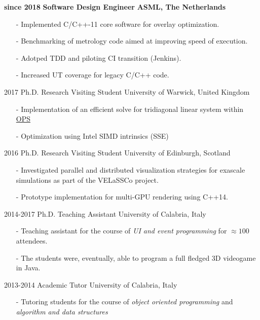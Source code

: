 \documentclass[]{twentysecondscv}
\begin{document}
\begin{twenty}
  \twentyitem
    {{\textbf{\color{darkgray}since 2018}}}
    {{\textbf{\color{darkgray}Software Design Engineer}}}
    {\textbf{\color{darkgray}ASML, The Netherlands}}
	{
		\vspace{-10pt}
		\begin{itemize}[leftmargin=*]
			\footnotesize
			\item[-] Implemented C/C++-11 core software for overlay optimization.
			\item[-] Benchmarking of metrology code aimed at improving speed of execution.
			\item[-] Adotped TDD and piloting CI transition (Jenkins).
			\item[-] Increased UT coverage for legacy C/C++ code.
		\end{itemize} 
	}
  \twentyitem
    {2017}
    {Ph.D.  Research Visiting Student}
    {University of Warwick, United Kingdom}
	{
		\vspace{-10pt}
		\begin{itemize}[leftmargin=*]
			\footnotesize
			\item[-] Implementation of an efficient solve for tridiagonal linear system within \href{https://github.com/OP-DSL/OPS}{OPS \faGithub}
			\item[-] Optimization using Intel SIMD intrinsics (SSE)
		\end{itemize} 
	}
  \twentyitem
    {2016}
    {Ph.D. {\normalfont Research Visiting Student}}
    {University of Edinburgh, Scotland}
	{
		\vspace{-10pt}
		\begin{itemize}[leftmargin=*]
			\footnotesize
			\item[-] Investigated parallel and distributed visualization strategies for exascale simulations as part of the VELaSSCo project.
			\item[-] Prototype implementation for multi-GPU rendering using C++14.
		\end{itemize} 
	}
  \twentyitem
    {2014-2017}
    {Ph.D. {\normalfont Teaching Assistant}}
    {University of Calabria, Italy}
	{
		\vspace{-10pt}
		\begin{itemize}[leftmargin=*]
			\footnotesize
			\item[-] Teaching assistant for the course of \emph{UI and event programming} for $\approx 100$ attendees.
			\item[-] The students were, eventually, able to program a full fledged 3D videogame in Java. 
		\end{itemize} 
	}
  \twentyitem
    {2013-2014}
    {Academic Tutor}
    {University of Calabria, Italy}
    {
	    \vspace{-10pt}
	    \begin{itemize}[leftmargin=*]
	    	\footnotesize
	    	\item[-] Tutoring students for the course of \textit{object oriented programming} and \textit{algorithm and data structures}
	    \end{itemize} 
    }
\end{twenty}
\end{document}

